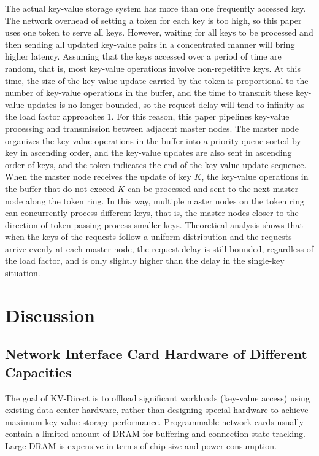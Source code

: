 The actual key-value storage system has more than one frequently accessed key. The network overhead of setting a token for each key is too high, so this paper uses one token to serve all keys. However, waiting for all keys to be processed and then sending all updated key-value pairs in a concentrated manner will bring higher latency. Assuming that the keys accessed over a period of time are random, that is, most key-value operations involve non-repetitive keys. At this time, the size of the key-value update carried by the token is proportional to the number of key-value operations in the buffer, and the time to transmit these key-value updates is no longer bounded, so the request delay will tend to infinity as the load factor approaches 1. For this reason, this paper pipelines key-value processing and transmission between adjacent master nodes. The master node organizes the key-value operations in the buffer into a priority queue sorted by key in ascending order, and the key-value updates are also sent in ascending order of keys, and the token indicates the end of the key-value update sequence. When the master node receives the update of key $K$, the key-value operations in the buffer that do not exceed $K$ can be processed and sent to the next master node along the token ring. In this way, multiple master nodes on the token ring can concurrently process different keys, that is, the master nodes closer to the direction of token passing process smaller keys. Theoretical analysis shows that when the keys of the requests follow a uniform distribution and the requests arrive evenly at each master node, the request delay is still bounded, regardless of the load factor, and is only slightly higher than the delay in the single-key situation.

\section{Discussion}
\label{kvdirect:sec:discussion}

\subsection{Network Interface Card Hardware of Different Capacities}
\label{kvdirect:sec:different-nic}

The goal of KV-Direct is to offload significant workloads (key-value access) using existing data center hardware, rather than designing special hardware to achieve maximum key-value storage performance. Programmable network cards usually contain a limited amount of DRAM for buffering and connection state tracking. Large DRAM is expensive in terms of chip size and power consumption.

